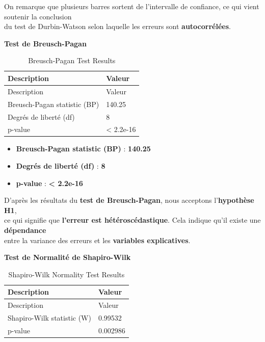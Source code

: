 \documentclass[
  12pt,
]{article}
\providecommand{\tightlist}{%
  \setlength{\itemsep}{0pt}\setlength{\parskip}{0pt}}
\begin{document}
On remarque que plusieurs barres sortent de l'intervalle de confiance,
ce qui vient soutenir la conclusion\\
du test de Durbin-Watson selon laquelle les erreurs sont
\textbf{autocorrélées}.

\textbf{Test de Breusch-Pagan}

\begin{longtable}[]{@{}ll@{}}
\caption{Breusch-Pagan Test Results}\tabularnewline
\toprule\noalign{}
Description & Valeur \\
\midrule\noalign{}
\endfirsthead
\toprule\noalign{}
Description & Valeur \\
\midrule\noalign{}
\endhead
\bottomrule\noalign{}
\endlastfoot
Breusch-Pagan statistic (BP) & 140.25 \\
Degrés de liberté (df) & 8 \\
p-value & \textless{} 2.2e-16 \\
\end{longtable}

\begin{itemize}
\tightlist
\item
  \textbf{Breusch-Pagan statistic (BP)} : \textbf{140.25}\\
\item
  \textbf{Degrés de liberté (df)} : \textbf{8}\\
\item
  \textbf{p-value} : \textbf{\textless{} 2.2e-16}
\end{itemize}

D'après les résultats du \textbf{test de Breusch-Pagan}, nous acceptons
l'\textbf{hypothèse H1},\\
ce qui signifie que \textbf{l'erreur est hétéroscédastique}. Cela
indique qu'il existe une \textbf{dépendance}\\
entre la variance des erreurs et les \textbf{variables explicatives}.

\textbf{Test de Normalité de Shapiro-Wilk}

\begin{longtable}[]{@{}ll@{}}
\caption{Shapiro-Wilk Normality Test Results}\tabularnewline
\toprule\noalign{}
Description & Valeur \\
\midrule\noalign{}
\endfirsthead
\toprule\noalign{}
Description & Valeur \\
\midrule\noalign{}
\endhead
\bottomrule\noalign{}
\endlastfoot
Shapiro-Wilk statistic (W) & 0.99532 \\
p-value & 0.002986 \\
\end{longtable}
\end{document}
